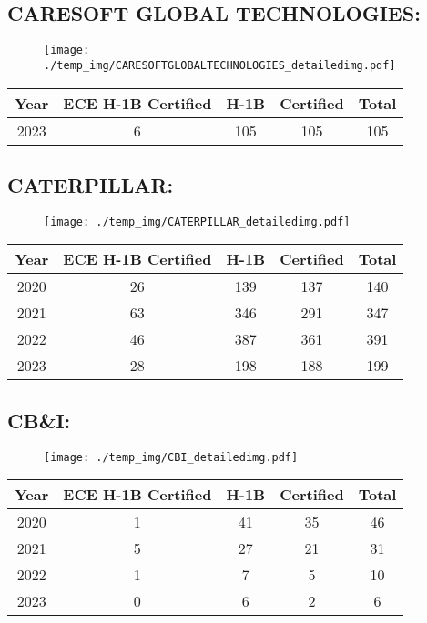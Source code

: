 \documentclass{article}%
\begin{document}
%
\newpage%
\subsection{CARESOFT GLOBAL TECHNOLOGIES:}%
\label{subsec:CARESOFTGLOBALTECHNOLOGIES}%
\label{CARESOFTGLOBALTECHNOLOGIESdetailed}%


\begin{figure}[htbp]%
\centering%
\texttt{[image: ./temp\_img/CARESOFTGLOBALTECHNOLOGIES\_detailedimg.pdf]}%
\end{figure}

%
\begin{longtable}{c|c|c|c|c}%
\hline%
Year&ECE H{-}1B Certified&H{-}1B&Certified&Total\\%
\hline%
2023&6&105&105&105\\%
\hline%
\end{longtable}

%
\newpage%
\subsection{CATERPILLAR:}%
\label{subsec:CATERPILLAR}%
\label{CATERPILLARdetailed}%


\begin{figure}[htbp]%
\centering%
\texttt{[image: ./temp\_img/CATERPILLAR\_detailedimg.pdf]}%
\end{figure}

%
\begin{longtable}{c|c|c|c|c}%
\hline%
Year&ECE H{-}1B Certified&H{-}1B&Certified&Total\\%
\hline%
2020&26&139&137&140\\%
\hline%
2021&63&346&291&347\\%
\hline%
2022&46&387&361&391\\%
\hline%
2023&28&198&188&199\\%
\hline%
\end{longtable}

%
\newpage%
\subsection{CB\&I:}%
\label{subsec:CBI}%
\label{CBIdetailed}%


\begin{figure}[htbp]%
\centering%
\texttt{[image: ./temp\_img/CBI\_detailedimg.pdf]}%
\end{figure}

%
\begin{longtable}{c|c|c|c|c}%
\hline%
Year&ECE H{-}1B Certified&H{-}1B&Certified&Total\\%
\hline%
2020&1&41&35&46\\%
\hline%
2021&5&27&21&31\\%
\hline%
2022&1&7&5&10\\%
\hline%
2023&0&6&2&6\\%
\hline%
\end{longtable}
\end{document}
